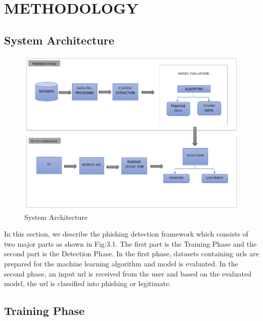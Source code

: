 
\normalsize\chapter{METHODOLOGY }
\section{System Architecture}
\begin{figure}[H]
\centerline{\includegraphics[scale=0.6]{newModel.png}}
\caption{System Architecture}
\label{fig}
\end{figure}
\par  In this section, we describe the phishing detection
framework which consists of two major parts as shown in Fig:3.1. The first part is the Training Phase and the second part is the Detection Phase. In
the first phase, datasets containing urls are prepared for the machine learning algorithm and model is evaluated. In the second phase, an input url is received from the user and based on the evaluated model, the url is classified into phishing or legitimate.
\section{Training Phase}
